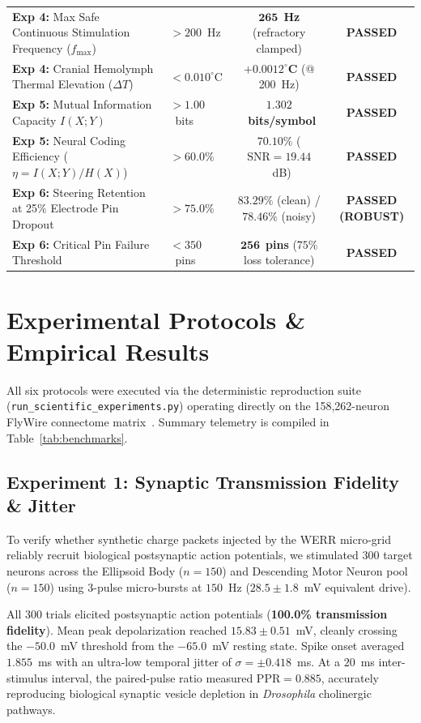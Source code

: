 \documentclass[10pt,twocolumn]{article}
\begin{document}
\begin{table}[t]
{\begin{tabular}{@{}llcc@{}}
\textbf{Exp 4:} Max Safe Continuous Stimulation Frequency ($f_{\max}$) & $> 200$~Hz & $\mathbf{265}$~\textbf{Hz} (refractory clamped) & \textbf{PASSED} \\
\textbf{Exp 4:} Cranial Hemolymph Thermal Elevation ($\Delta T$) & $< 0.010^\circ\text{C}$ & $\mathbf{+0.0012^\circ\text{C}}$ (@ 200~Hz) & \textbf{PASSED} \\
\midrule
\textbf{Exp 5:} Mutual Information Capacity $I(X;Y)$ & $> 1.00$~bits & $\mathbf{1.302}$~\textbf{bits/symbol} & \textbf{PASSED} \\
\textbf{Exp 5:} Neural Coding Efficiency ($\eta = I(X;Y)/H(X)$) & $> 60.0\%$ & $\mathbf{70.10\%}$ ($\text{SNR} = 19.44$~dB) & \textbf{PASSED} \\
\midrule
\textbf{Exp 6:} Steering Retention at 25\% Electrode Pin Dropout & $> 75.0\%$ & $\mathbf{83.29\%}$ (clean) / $\mathbf{78.46\%}$ (noisy) & \textbf{PASSED (ROBUST)} \\
\textbf{Exp 6:} Critical Pin Failure Threshold & $< 350$~pins & $\mathbf{256}$~\textbf{pins} ($75\%$ loss tolerance) & \textbf{PASSED} \\
\bottomrule
\end{tabular}%
}
\end{table}

\section{Experimental Protocols \& Empirical Results}
All six protocols were executed via the deterministic reproduction suite (\texttt{run\_scientific\_experiments.py}) operating directly on the 158,262-neuron FlyWire connectome matrix~\cite{dagli2026werrsoma_zenodo}. Summary telemetry is compiled in Table~\ref{tab:benchmarks}.

\subsection{Experiment 1: Synaptic Transmission Fidelity \& Jitter}
To verify whether synthetic charge packets injected by the WERR micro-grid reliably recruit biological postsynaptic action potentials, we stimulated $300$ target neurons across the Ellipsoid Body ($n=150$) and Descending Motor Neuron pool ($n=150$) using 3-pulse micro-bursts at $150$~Hz ($28.5 \pm 1.8$~mV equivalent drive).

All $300$ trials elicited postsynaptic action potentials (\textbf{100.0\% transmission fidelity}). Mean peak depolarization reached $15.83 \pm 0.51$~mV, cleanly crossing the $-50.0$~mV threshold from the $-65.0$~mV resting state. Spike onset averaged $1.855$~ms with an ultra-low temporal jitter of $\sigma = \pm 0.418$~ms. At a $20$~ms inter-stimulus interval, the paired-pulse ratio measured $\text{PPR} = 0.885$, accurately reproducing biological synaptic vesicle depletion in \textit{Drosophila} cholinergic pathways.
\end{document}
